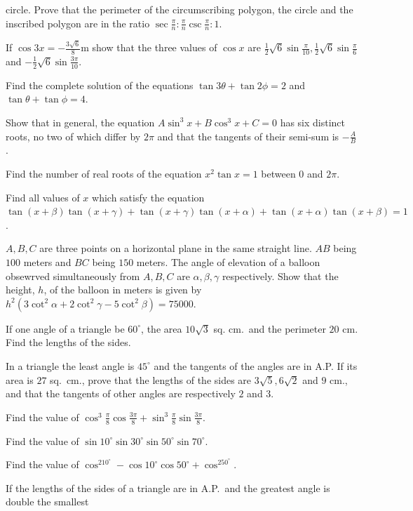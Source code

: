   circle. Prove that the perimeter of the circumscribing polygon, the circle and the inscribed polygon are
  in the ratio $\sec\frac{\pi}{n} : \frac{\pi}{n}\csc\frac{\pi}{n}: 1$.
\item If $\cos3x = -\frac{3\sqrt{6}}{8}$m show that the three values of $\cos x$ are
  $\frac{1}{2}\sqrt{6}\sin\frac{\pi}{10}, \frac{1}{2}\sqrt{6}\sin\frac{\pi}{6}$ and
  $-\frac{1}{2}\sqrt{6}\sin\frac{3\pi}{10}$.
\item Find the complete solution of the equations $\tan3\theta + \tan2\phi = 2$ and $\tan\theta + \tan\phi =
  4$.
\item Show that in general, the equation $A\sin^3x + B\cos^3x + C = 0$ has six distinct roots, no two of
  which differ by $2\pi$ and that the tangents of their semi-sum is $-\frac{A}{B}$.
\item Find the number of real roots of the equation $x^2\tan x = 1$ between $0$ and $2\pi$.
\item Find all values of $x$ which satisfy the equation $\tan(x + \beta)\tan(x + \gamma) + \tan(x
  + \gamma)\tan(x + \alpha) + \tan(x + \alpha)\tan(x + \beta) = 1$.
\item $A, B, C$ are three points on a horizontal plane in the same straight line. $AB$ being $100$ meters
  and $BC$ being $150$ meters. The angle of elevation of a balloon obsewrved simultaneously from $A, B, C$
  are $\alpha, \beta, \gamma$ respectively. Show that the height, $h$, of the balloon in meters is given by
  $h^2\left(3\cot^2\alpha + 2\cot^2\gamma - 5\cot^2\beta\right) = 75000$.
\item If one angle of a triangle be $60^\circ$, the area $10\sqrt{3}$ sq. cm.\ and the perimeter $20$
  cm. Find the lengths of the sides.
\item In a triangle the least angle is $45^\circ$ and the tangents of the angles are in A.P. If its area is
  $27$ sq.\ cm., prove that the lengths of the sides are $3\sqrt{5}, 6\sqrt{2}$ and $9$ cm., and that the
  tangents of other angles are respectively $2$ and $3$.
\item Find the value of $\cos^3\frac{\pi}{8}\cos\frac{3\pi}{8} + \sin^3\frac{\pi}{8}\sin\frac{3\pi}{8}$.
\item Find the value of $\sin10^\circ\sin30^\circ\sin50^\circ\sin70^\circ$.
\item Find the value of $\cos^210^\circ - \cos10^\circ\cos50^\circ + \cos^250^\circ$.
\item If the lengths of the sides of a triangle are in A.P.\ and the greatest angle is double the smallest
